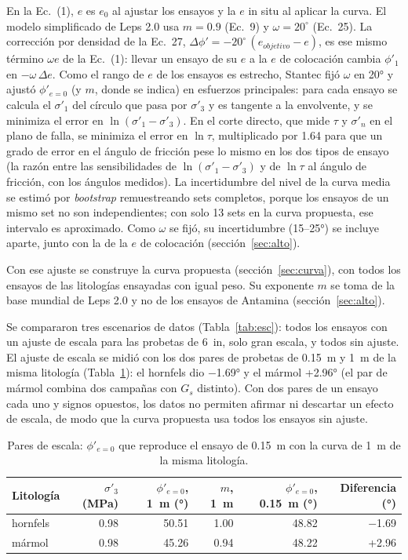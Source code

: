 \documentclass[11pt,letterpaper]{article}
\begin{document}
En la Ec.~(1), $e$ es $e_0$ al ajustar los ensayos y la $e$ in situ al aplicar la curva. El modelo simplificado de Leps 2.0 usa $m = 0.9$ (Ec.~9) y $\omega = 20^{\circ}$ (Ec.~25). La corrección por densidad de la Ec.~27, $\Delta\phi' = -20^{\circ}\,(e_{objetivo} - e)$, es ese mismo término $\omega e$ de la Ec.~(1): llevar un ensayo de su $e$ a la $e$ de colocación cambia $\phi'_1$ en $-\omega\,\Delta e$. Como el rango de $e$ de los ensayos es estrecho, Stantec fijó $\omega$ en 20° y ajustó $\phi'_{e=0}$ (y $m$, donde se indica) en esfuerzos principales: para cada ensayo se calcula el $\sigma'_1$ del círculo que pasa por $\sigma'_3$ y es tangente a la envolvente, y se minimiza el error en $\ln(\sigma'_1 - \sigma'_3)$. En el corte directo, que mide $\tau$ y $\sigma'_n$ en el plano de falla, se minimiza el error en $\ln\tau$, multiplicado por 1.64 para que un grado de error en el ángulo de fricción pese lo mismo en los dos tipos de ensayo (la razón entre las sensibilidades de $\ln(\sigma'_1 - \sigma'_3)$ y de $\ln\tau$ al ángulo de fricción, con los ángulos medidos). La incertidumbre del nivel de la curva media se estimó por \emph{bootstrap} remuestreando sets completos, porque los ensayos de un mismo set no son independientes; con solo 13 sets en la curva propuesta, ese intervalo es aproximado. Como $\omega$ se fijó, su incertidumbre (15--25°) se incluye aparte, junto con la de la $e$ de colocación (sección~\ref{sec:alto}).

Con ese ajuste se construye la curva propuesta (sección~\ref{sec:curva}), con todos los ensayos de las litologías ensayadas con igual peso. Su exponente $m$ se toma de la base mundial de Leps 2.0 y no de los ensayos de Antamina (sección~\ref{sec:alto}).

Se compararon tres escenarios de datos (Tabla~\ref{tab:esc}): todos los ensayos con un ajuste de escala para las probetas de 6~in, solo gran escala, y todos sin ajuste. El ajuste de escala se midió con los dos pares de probetas de 0.15~m y 1~m de la misma litología (Tabla~\ref{tab:escala}): el hornfels dio $-$1.69° y el mármol +2.96° (el par de mármol combina dos campañas con $G_s$ distinto). Con dos pares de un ensayo cada uno y signos opuestos, los datos no permiten afirmar ni descartar un efecto de escala, de modo que la curva propuesta usa todos los ensayos sin ajuste.

\begin{table}[!htbp]\centering\small\caption{Pares de escala: $\phi'_{e=0}$ que reproduce el ensayo de 0.15~m con la curva de 1~m de la misma litología.}\label{tab:escala}
\begin{tabular}{lrrrrr}\toprule Litología & $\sigma'_3$ (MPa) & $\phi'_{e=0}$, 1~m (°) & $m$, 1~m & $\phi'_{e=0}$, 0.15~m (°) & Diferencia (°)\\\midrule
hornfels & 0.98 & 50.51 & 1.00 & 48.82 & $-$1.69 \\
mármol & 0.98 & 45.26 & 0.94 & 48.22 & +2.96 \\
\bottomrule\end{tabular}\end{table}
\end{document}
